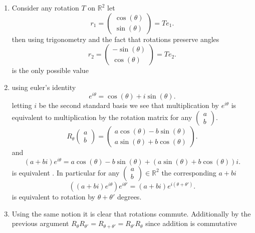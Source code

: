 \documentclass{article}
\begin{document}
    \begin{enumerate}[label = (\alph*)]
        \item Consider any rotation $T$ on $ \mathbb{R}^2$ let
            \[
            r_1 = \begin{pmatrix} \cos(\theta) \\ \sin(\theta) \end{pmatrix}  = Te_1
            .\] 
            then using trigonometry and the fact that rotations preserve angles
            \[
            r_2 = \begin{pmatrix} -\sin(\theta) \\ \cos(\theta) \end{pmatrix}  = Te_2
            .\] 
            is the only possible value
        \item 
            using euler's identity
            \[
            e^{i\theta} = \cos(\theta) + i\sin(\theta)
            .\] 
            letting $i$ be the second standard basis we see that multiplication by $e^{i\theta}$ is equivalent
            to multiplication by the rotation matrix for any $\begin{pmatrix} a \\ b \end{pmatrix} $.
            \[
                R_\theta \begin{pmatrix} a \\ b \end{pmatrix}  = \begin{pmatrix} a\cos(\theta) - b\sin(\theta) \\ a\sin(\theta) + b\cos(\theta) \end{pmatrix} 
            .\] 
            and
            \[
                (a+bi)e^{i\theta} = a\cos(\theta) - b\sin(\theta) + (a\sin(\theta) + b\cos(\theta))i
            .\] 
            is equivalent
            . In particular for any $\begin{pmatrix} a \\ b \end{pmatrix} \in \mathbb{R}^2$ the corresponding $a +bi$
            \[
                ((a+bi)e^{i\theta})e^{i\theta'} = (a+bi)e^{i(\theta+\theta')}
            .\] 
            is equivalent to rotation by $\theta + \theta'$ degrees.
        \item Using the same notion it is clear that rotations commute. Additionally by the previous argument
            $R_{\theta}R_{\theta'} = R_{\theta+\theta'} = R_{\theta'}R_{\theta}$ since addition is commutative
    \end{enumerate}
\end{document}
